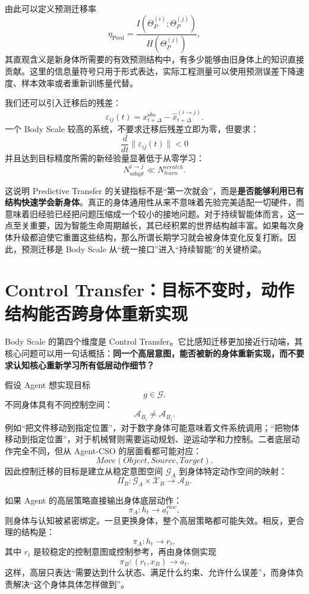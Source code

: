 由此可以定义预测迁移率
\[
\eta_{\mathrm{Pred}}
=
\frac{
I
\left(
\Theta_P^{(i)};
\Theta_P^{(j)}
\right)
}{
H
\left(
\Theta_P^{(j)}
\right)
},
\]
其直观含义是新身体所需要的有效预测结构中，有多少能够由旧身体上的知识直接贡献。这里的信息量符号只用于形式表达，实际工程测量可以使用预测误差下降速度、样本效率或者重新训练量代替。

我们还可以引入迁移后的残差：
\[
\varepsilon_{ij}(t)
=
x_{t+\Delta}^{obs}
-
\hat{x}_{t+\Delta}^{(i\rightarrow j)}.
\]
一个 Body Scale 较高的系统，不要求迁移后残差立即为零，但要求：
\[
\frac{d}{dt}
\|\varepsilon_{ij}(t)\|
<0
\]
并且达到目标精度所需的新经验量显著低于从零学习：
\[
N_{adapt}^{i\rightarrow j}
\ll
N_{learn}^{scratch}.
\]

这说明 Predictive Transfer 的关键指标不是“第一次就会”，而是\textbf{是否能够利用已有结构快速学会新身体}。真正的身体通用性从来不意味着先验完美适配一切硬件，而意味着旧经验已经把问题压缩成一个较小的接地问题。对于持续智能体而言，这一点至关重要，因为智能生命周期越长，其已经积累的世界结构越丰富。如果每次身体升级都迫使它重置这些结构，那么所谓长期学习就会被身体变化反复打断。因此，预测迁移是 Body Scale 从“统一接口”进入“持续智能”的关键桥梁。


\section{Control Transfer：目标不变时，动作结构能否跨身体重新实现}

Body Scale 的第四个维度是 Control Transfer。它比感知迁移更加接近行动端，其核心问题可以用一句话概括：\textbf{同一个高层意图，能否被新的身体重新实现，而不要求认知核心重新学习所有低层动作细节？}

假设 Agent 想实现目标
\[
g\in\mathcal G.
\]
不同身体具有不同控制空间：
\[
\mathcal A_{B_i}
\neq
\mathcal A_{B_j}.
\]
例如“把文件移动到指定位置”，对于数字身体可能意味着文件系统调用；“把物体移动到指定位置”，对于机械臂则需要运动规划、逆运动学和力控制。二者底层动作完全不同，但从 Agent-CSO 的层面看都可能对应：
\[
Move(Object,Source,Target).
\]
因此控制迁移的目标是建立从稳定意图空间 $\mathcal G_A$ 到身体特定动作空间的映射：
\[
\Pi_B:
\mathcal G_A
\times
\mathcal X_B
\rightarrow
\mathcal A_B.
\]

如果 Agent 的高层策略直接输出身体底层动作：
\[
\pi_A:
h_t\rightarrow a_t^{raw},
\]
则身体与认知被紧密绑定。一旦更换身体，整个高层策略都可能失效。相反，更合理的结构是：
\[
\pi_A:
h_t
\rightarrow
r_t,
\]
其中 $r_t$ 是较稳定的控制意图或控制参考，再由身体侧实现
\[
\pi_B:
(r_t,x_B)
\rightarrow
a_t.
\]
这样，高层只表达“需要达到什么状态、满足什么约束、允许什么误差”，而身体负责解决“这个身体具体怎样做到”。

